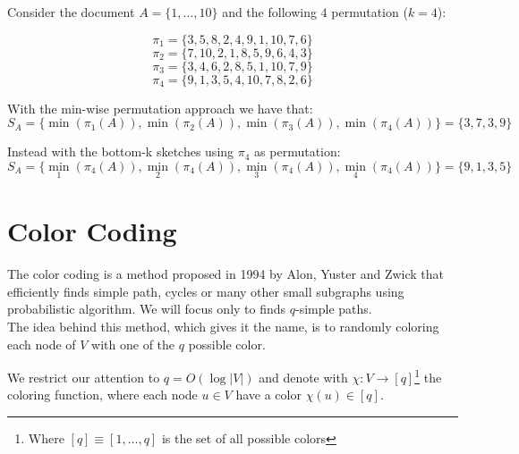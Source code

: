 \begin{esempio}
	Consider the document $A=\{1, \ldots, 10\}$ and the following $4$ permutation ($k = 4$):
	
	\begin{equation*}
		\pi_{1} = \{3, 5, 8, 2, 4, 9, 1, 10, 7, 6\}
	\end{equation*}
	\begin{equation*}
		\pi_{2} = \{7, 10, 2, 1, 8, 5, 9, 6, 4, 3\}
	\end{equation*}
	\begin{equation*}
		\pi_{3} = \{3, 4, 6, 2, 8, 5, 1, 10, 7, 9\}
	\end{equation*}
	\begin{equation*}
		\pi_{4} = \{9, 1, 3, 5, 4, 10, 7, 8, 2, 6\}
	\end{equation*}
	
	With the min-wise permutation approach we have that:
	\begin{equation*}
		S_{A} = \{ \min(\pi_{1}(A)), \min(\pi_{2}(A)), \min(\pi_{3}(A)), \min(\pi_{4}(A)) \} = \{3, 7, 3, 9\}
	\end{equation*}
	
	Instead with the bottom-k sketches using $\pi_{4}$ as permutation:
	\begin{equation*}
	S_{A} = \{ \min_{1}(\pi_{4}(A)), \min_{2}(\pi_{4}(A)), \min_{3}(\pi_{4}(A)), \min_{4}(\pi_{4}(A)) \} = \{9, 1, 3, 5\}
	\end{equation*}
	
\end{esempio}


\section{Color Coding}

The color coding is a method proposed in 1994 by Alon, Yuster and Zwick\cite{Alon:1995:COL:210332.210337} that efficiently finds simple path, cycles or many other small subgraphs using probabilistic algorithm. We will focus only to finds $q$-simple paths.\\

The idea behind this method, which gives it the name, is to randomly coloring each node of $V$ with one of the $q$ possible color.

We restrict our attention to $q = O(\log |V|)$ and denote with $\chi : V \rightarrow [q]$\footnote{Where $[q] \equiv [1, \ldots, q]$ is the set of all possible colors} the coloring function, where each node $u \in V$ have a color $\chi(u) \in [q]$.\\

